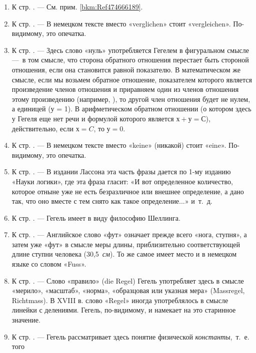 \begin{enumerate}
\item \label{bkm:Ref474666244}К стр. \pageref{bkm:bm54}. — См. прим.
\ref{bkm:Ref474666189}.
\item \label{bkm:Ref474666256}К стр. \pageref{bkm:bm55}. — В немецком тексте
вместо «verglichen» стоит «vergleichen». По-видимому, это опечатка.
\item \label{bkm:Ref474666305}К стр. \pageref{bkm:bm56}. — Здесь слово «нуль»
употребляется Гегелем в фигуральном смысле —~в том смысле, что сторона
обратного отношения перестает быть стороной отношения, если она становится
равной показателю. В математическом же смысле, если мы возьмем обратное
отношение, показателем которого является произведение членов отношения  и
приравняем один из членов отношения этому произведению (например, ), то
другой член отношения будет не нулем, а единицей (у = 1). В арифметическом
обратном отношении (о котором здесь у Гегеля еще нет речи и формулой
которого является $х+у=С$), действительно, если $х=C$,
то $у=0$.
\item \label{bkm:Ref474666541}К стр. \pageref{bkm:bm57}. — В немецком тексте
вместо «keine» (никакой) стоит «eine». По-видимому, это опечатка.
\item \label{bkm:Ref474666560}К стр. \pageref{bkm:bm58}. — В издании Лассона
эта часть фразы дается по 1-му изданию «Науки логики», где эта фраза
гласит: «И вот определенное количество, которое отныне уже не есть
безразличное или внешнее определение, а дано так, что оно вместе с тем
снято как такое определение...» и~т.~д.
\item \label{bkm:Ref474666566}К стр. \pageref{bkm:bm59}. — Гегель имеет в
виду философию Шеллинга.
\item \label{bkm:Ref474666577}К стр. \pageref{bkm:bm60}. — Английское слово
«фут» означает прежде всего «нога, ступня», а затем уже «фут» в смысле меры
длины, приблизительно соответствующей длине ступни человека
(30,5~{\em см}). То же самое имеет место и в немецком языке со словом
«Fuss».
\item \label{bkm:Ref474666643}К стр. \pageref{bkm:bm61}. — Слово «правило»
(die Regel) Гегель употребляет здесь в смысле «мерило», «масштаб», «норма»,
«образцовая или указная мера» (Massregel, Richtmass). В XVIII в. слово
«Regel» иногда употреблялось в смысле линейки с делениями. Гегель,
по-видимому, и намекает на это старинное значение.
\item \label{bkm:Ref474666655}К стр. \pageref{bkm:bm62}. — Гегель
рассматривает здесь понятие физической {\em константы},~т.~е. того

\end{enumerate}
